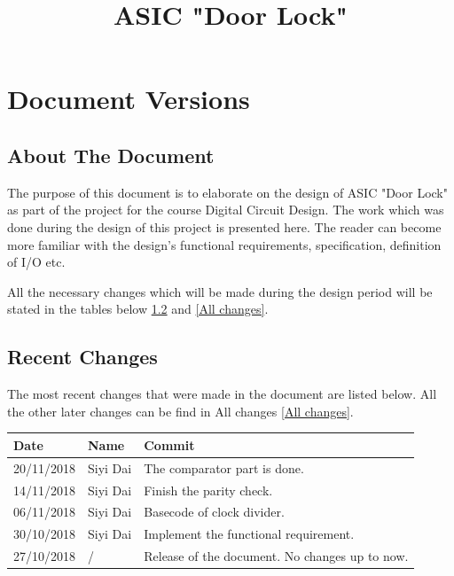 \documentclass[a4paper, twoside]{report}
\title{ASIC "Door Lock"}
\begin{document}


\newpage
\tableofcontents
\newpage

\chapter{Document Versions}
\section{About The Document}
\begin{flushleft}
The purpose of this document is to elaborate on the design of ASIC "Door Lock" as part of the project for the course Digital Circuit Design. The work which was done during the design of this project is presented here. The reader can become more familiar with the design's functional requirements, specification, definition of I/O etc. \newline \par
All the necessary changes which will be made during the design period will be stated in the tables below \ref{recent} and \ref{All changes}.\par
\end{flushleft}
\section{Recent Changes}\label{recent}

The most recent changes that were made in the document are listed below. All the other later changes can be find in All changes \ref{All changes}. \par

\begin{flushleft}
    \begin{tabular}{ | l | l | p{11cm} |}
    \hline
    Date & Name & Commit \\ \hline
    20/11/2018 & Siyi Dai & The comparator part is done. \\ \hline
    14/11/2018 & Siyi Dai & Finish the parity check. \\ \hline
    06/11/2018 & Siyi Dai & Basecode of clock divider. \\ \hline
    30/10/2018 & Siyi Dai & Implement the functional requirement. \\ \hline
    27/10/2018 & / & Release of the document. No changes up to now. \\ \hline
    \end{tabular}
\end{flushleft}
\end{document}
